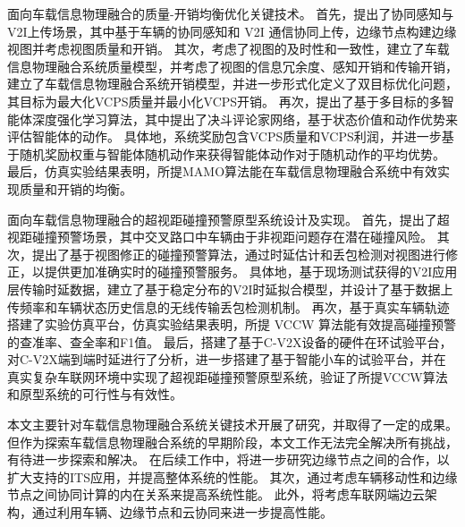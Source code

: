  面向车载信息物理融合的质量-开销均衡优化关键技术。
首先，提出了协同感知与V2I上传场景，其中基于车辆的协同感知和 V2I 通信协同上传，边缘节点构建边缘视图并考虑视图质量和开销。
其次，考虑了视图的及时性和一致性，建立了车载信息物理融合系统质量模型，并考虑了视图的信息冗余度、感知开销和传输开销，建立了车载信息物理融合系统开销模型，并进一步形式化定义了双目标优化问题，其目标为最大化VCPS质量并最小化VCPS开销。
再次，提出了基于多目标的多智能体深度强化学习算法，其中提出了决斗评论家网络，基于状态价值和动作优势来评估智能体的动作。
具体地，系统奖励包含VCPS质量和VCPS利润，并进一步基于随机奖励权重与智能体随机动作来获得智能体动作对于随机动作的平均优势。
最后，仿真实验结果表明，所提MAMO算法能在车载信息物理融合系统中有效实现质量和开销的均衡。

 面向车载信息物理融合的超视距碰撞预警原型系统设计及实现。
首先，提出了超视距碰撞预警场景，其中交叉路口中车辆由于非视距问题存在潜在碰撞风险。
其次，提出了基于视图修正的碰撞预警算法，通过时延估计和丢包检测对视图进行修正，以提供更加准确实时的碰撞预警服务。
具体地，基于现场测试获得的V2I应用层传输时延数据，建立了基于稳定分布的V2I时延拟合模型，并设计了基于数据上传频率和车辆状态历史信息的无线传输丢包检测机制。
再次，基于真实车辆轨迹搭建了实验仿真平台，仿真实验结果表明，所提 VCCW 算法能有效提高碰撞预警的查准率、查全率和F1值。
最后，搭建了基于C-V2X设备的硬件在环试验平台，对C-V2X端到端时延进行了分析，进一步搭建了基于智能小车的试验平台，并在真实复杂车联网环境中实现了超视距碰撞预警原型系统，验证了所提VCCW算法和原型系统的可行性与有效性。

本文主要针对车载信息物理融合系统关键技术开展了研究，并取得了一定的成果。
但作为探索车载信息物理融合系统的早期阶段，本文工作无法完全解决所有挑战，有待进一步探索和解决。
在后续工作中，将进一步研究边缘节点之间的合作，以扩大支持的ITS应用，并提高整体系统的性能。
其次，通过考虑车辆移动性和边缘节点之间协同计算的内在关系来提高系统性能。
此外，将考虑车联网端边云架构，通过利用车辆、边缘节点和云协同来进一步提高性能。
